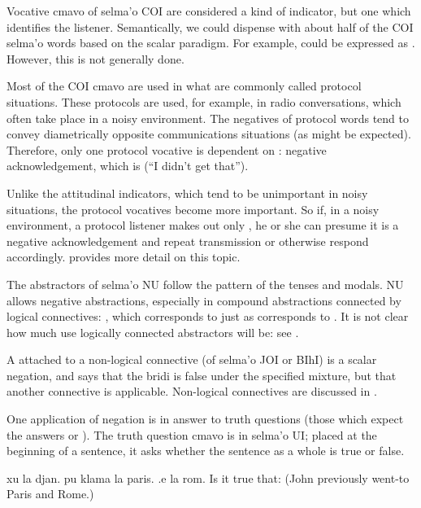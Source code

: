 Vocative cmavo of selma'o COI are considered a kind of
    indicator, but one which identifies the listener. Semantically,
    we could dispense with about half of the COI selma'o words
    based on the scalar paradigm. For example,  could be
    expressed as . However, this is not generally
    done.

Most of the COI cmavo are used in what are commonly called
    protocol situations. These protocols are used, for example, in
    radio conversations, which often take place in a noisy
    environment. The negatives of protocol words tend to convey
    diametrically opposite communications situations (as might be
    expected). Therefore, only one protocol vocative is dependent
    on : negative acknowledgement, which is  (``I
    didn't get that'').

Unlike the attitudinal indicators, which tend to be
    unimportant in noisy situations, the protocol vocatives become
    more important. So if, in a noisy environment, a protocol
    listener makes out only , he or she can presume it is a
    negative acknowledgement and repeat transmission or otherwise
    respond accordingly. 
    provides more detail on this topic.

The abstractors of selma'o NU follow the pattern of the
    tenses and modals. NU allows negative abstractions, especially
    in compound abstractions connected by logical connectives:
    , which corresponds to  just as
     corresponds to . It is not clear
    how much use logically connected abstractors will be: see .

A  attached to a non-logical connective (of selma'o
    JOI or BIhI) is a scalar negation, and says that the bridi is
    false under the specified mixture, but that another connective
    is applicable. Non-logical connectives are discussed in .



One application of negation is in answer to truth questions
    (those which expect the answers  or ). The truth
    question cmavo  is in selma'o UI; placed at the beginning
    of a sentence, it asks whether the sentence as a whole is true
    or false.
\begin{example}
xu la djan. pu klama la paris. .e la rom.\n
Is it true that:\n
\T	(John previously went-to  Paris and Rome.)
\end{example}

